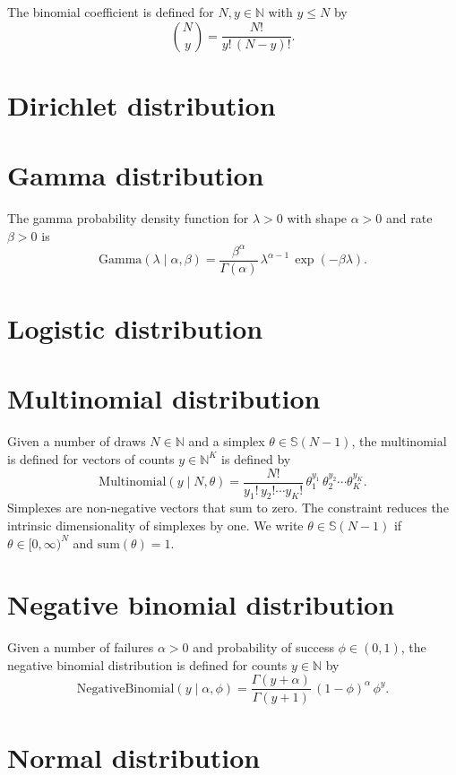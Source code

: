 \documentclass[11pt]{report}
\begin{document}
The binomial coefficient is defined for $N, y \in \mathbb{N}$ with $y
\leq N$ by
\[
  \binom{N}{y} = \frac{N!}{y! \, (N - y)!}.
\]

\section{Dirichlet distribution}

\section{Gamma distribution}

The gamma probability density function for $\lambda > 0$
with shape $\alpha > 0$ and rate $\beta > 0$ is
\[
  \textrm{Gamma}(\lambda \mid \alpha, \beta)
  = \frac{\beta^{\alpha}}{\Gamma(\alpha)}
  \, \lambda^{\alpha - 1}
  \, \exp(-\beta \lambda).
\]


\section{Logistic distribution}

\section{Multinomial distribution}

Given a number of draws $N \in \mathbb{N}$ and a simplex
$\theta \in \mathbb{S}(N-1)$, the multinomial is defined for vectors
of counts $y \in \mathbb{N}^K$ is defined by
%
\[
  \textrm{Multinomial}(y \mid N, \theta)
  = \frac{N!}{y_1! \, y_2! \cdots y_K!} \, \theta_1^{y_1} \, \theta_2^{y_2} \cdots \theta_K^{y_K}.
\]
Simplexes are non-negative vectors that sum to zero.  The constraint
reduces the intrinsic dimensionality of simplexes by one.  We
write
$\theta \in \mathbb{S}(N - 1)$ if $\theta \in [0, \infty)^N$
and $\textrm{sum}(\theta) = 1$.

\section{Negative binomial distribution}

Given a number of failures $\alpha > 0$ and probability of success
$\phi \in (0, 1)$, the negative binomial distribution is defined for
counts $y \in \mathbb{N}$ by
\[
  \textrm{NegativeBinomial}(y \mid \alpha, \phi)
  = \frac{\Gamma(y + \alpha)}{\Gamma(y + 1)}
  \, (1 - \phi)^\alpha
  \, \phi^y.
\]


\section{Normal distribution}
\end{document}
